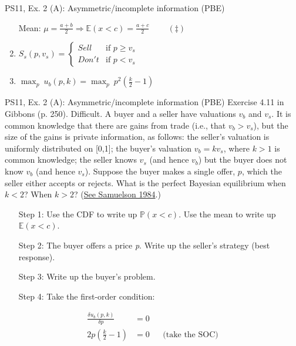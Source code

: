 \begin{frame}{PS11, Ex. 2 (A): Asymmetric/incomplete information (PBE)}
\begin{multicols}{2}
\begin{enumerate}
        \item[Mean:] $\mu=\frac{a+b}{2}\Rightarrow\mathbb{E}(x<c)=\frac{a+c}{2}\quad\quad\ (\ddagger)$
        \item $S_s(p,v_s)=\left\{\begin{array}{ll}
          Sell  & \text{if }p\geq v_s \\
          Don't & \text{if }p < v_s
        \end{array}\right.$
        \item $\displaystyle{\max_p}\ u_b(p,k)=\displaystyle{\max_p}\ p^2\left(\frac{k}{2}-1\right)$
      \end{enumerate}
      \vfill\null
    \end{multicols}
\end{frame}
\begin{frame}{PS11, Ex. 2 (A): Asymmetric/incomplete information (PBE)}
    Exercise 4.11 in Gibbons (p. 250). Difficult. A buyer and a seller have valuations $v_b$ and $v_s$. It is common knowledge that there are gains from trade (i.e., that $v_b > v_s$), but the size of the gains is private information, as follows: the seller’s valuation is uniformly distributed on [0,1]; the buyer’s valuation $v_b = kv_s$, where $k > 1$ is common knowledge; the seller knows $v_s$ (and hence $v_b$) but the buyer does not know $v_b$ (and hence $v_s$). Suppose the buyer makes a single offer, $p$, which the seller either accepts or rejects. What is the perfect Bayesian equilibrium when $k < 2$? When $k > 2$? (\href{https://www.jstor.org/stable/1911195}{See Samuelson 1984}.) \vspace{-8pt}
    \begin{multicols}{2}
      \begin{itemize}
        \item[Step 1:] Use the CDF to write up $\mathbb{P}(x<c)$. Use the mean to write up $\mathbb{E}(x<c)$.
        \item[Step 2:] The buyer offers a price \textit{p}. Write up the seller's strategy (best response).
        \item[Step 3:] Write up the buyer's problem.
        \item[Step 4:] Take the first-order condition:
      \end{itemize} \vspace{-8pt}
      \begin{align*}
        \frac{\delta u_b(p,k)}{\delta p}&=0\\
        2p\left(\frac{k}{2}-1\right)&=0&&\text{(take the SOC)}\\

\end{align*}
\end{multicols}
\end{frame}
